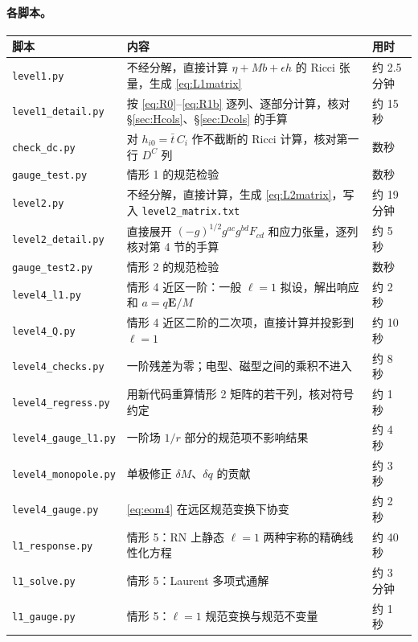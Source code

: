 \documentclass[11pt,a4paper]{ctexart}
\numberwithin{equation}{section}
\begin{document}
\paragraph{各脚本。}
\begin{center}\small
\begin{tabular}{p{}p{}l}
\hline
脚本 & 内容 & 用时\\
\hline
\texttt{level1.py} & 不经分解，直接计算 $\eta+Mb+\epsilon h$ 的 Ricci 张量，生成 \eqref{eq:L1matrix} & 约 2.5 分钟\\
\texttt{level1\_detail.py} & 按 \eqref{eq:R0}--\eqref{eq:R1b} 逐列、逐部分计算，核对 \S\ref{sec:Hcols}、\S\ref{sec:Dcols} 的手算 & 约 15 秒\\
\texttt{check\_dc.py} & 对 $h_{i0}=\bar t\,C_i$ 作不截断的 Ricci 计算，核对第一行 $D^C$ 列 & 数秒\\
\texttt{gauge\_test.py} & 情形 1 的规范检验 & 数秒\\
\texttt{level2.py} & 不经分解，直接计算，生成 \eqref{eq:L2matrix}，写入 \texttt{level2\_matrix.txt} & 约 19 分钟\\
\texttt{level2\_detail.py} & 直接展开 $(-g)^{1/2}g^{ac}g^{bd}F_{cd}$ 和应力张量，逐列核对第 4 节的手算 & 约 5 秒\\
\texttt{gauge\_test2.py} & 情形 2 的规范检验 & 数秒\\
\texttt{level4\_l1.py} & 情形 4 近区一阶：一般 $\ell=1$ 拟设，解出响应和 $a=q\boldsymbol E/M$ & 约 2 秒\\
\texttt{level4\_Q.py} & 情形 4 近区二阶的二次项，直接计算并投影到 $\ell=1$ & 约 10 秒\\
\texttt{level4\_checks.py} & 一阶残差为零；电型、磁型之间的乘积不进入 & 约 8 秒\\
\texttt{level4\_regress.py} & 用新代码重算情形 2 矩阵的若干列，核对符号约定 & 约 1 秒\\
\texttt{level4\_gauge\_l1.py} & 一阶场 $1/r$ 部分的规范项不影响结果 & 约 4 秒\\
\texttt{level4\_monopole.py} & 单极修正 $\delta M$、$\delta q$ 的贡献 & 约 3 秒\\
\texttt{level4\_gauge.py} & \eqref{eq:eom4} 在远区规范变换下协变 & 约 2 秒\\
\texttt{l1\_response.py} & 情形 5：RN 上静态 $\ell=1$ 两种宇称的精确线性化方程 & 约 40 秒\\
\texttt{l1\_solve.py} & 情形 5：Laurent 多项式通解 & 约 3 分钟\\
\texttt{l1\_gauge.py} & 情形 5：$\ell=1$ 规范变换与规范不变量 & 约 1 秒\\

\end{tabular}
\end{center}
\end{document}
